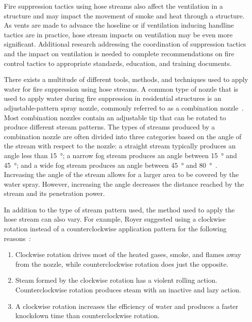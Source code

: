 \documentclass[12pt,oneside]{book}
\begin{document}
Fire suppression tactics using hose streams also affect the ventilation in a structure and may impact the movement of smoke and heat through a structure. As vents are made to advance the hoseline or if ventilation inducing handline tactics are in practice, hose stream impacts on ventilation may be even more significant. Additional research addressing the coordination of suppression tactics and the impact on ventilation is needed to complete recommendations on fire control tactics to appropriate standards, education, and training documents.

There exists a multitude of different tools, methods, and techniques used to apply water for fire suppression using hose streams. A common type of nozzle that is used to apply water during fire suppression in residential structures is an adjustable-pattern spray nozzle, commonly referred to as a combination nozzle~\cite{NFPA_1964}. Most combination nozzles contain an adjustable tip that can be rotated to produce different stream patterns. The types of streams produced by a combination nozzle are often divided into three categories based on the angle of the stream with respect to the nozzle: a straight stream typically produces an angle less than 15\SI{}{\degree}; a narrow fog stream produces an angle between 15\SI{}{\degree} and 45\SI{}{\degree}; and a wide fog stream produces an angle between 45\SI{}{\degree} and 80\SI{}{\degree}~\cite{IFSTA:Essentials_of_FF}. Increasing the angle of the stream allows for a larger area to be covered by the water spray.  However, increasing the angle decreases the distance reached by the stream and its penetration power. 

In addition to the type of stream pattern used, the method used to apply the hose stream can also vary. For example, Royer suggested using a clockwise rotation instead of a counterclockwise application pattern for the following reasons~\cite{Royer:ISU}:
\begin{enumerate} 
	\item Clockwise rotation drives most of the heated gases, smoke, and flames away from the nozzle, while counterclockwise rotation does just the opposite.
	\item Steam formed by the clockwise rotation has a violent rolling action. Counterclockwise rotation produces steam with an inactive and lazy action.
	\item A clockwise rotation increases the efficiency of water and produces a faster knockdown time than counterclockwise rotation.
\end{enumerate}
\end{document}
